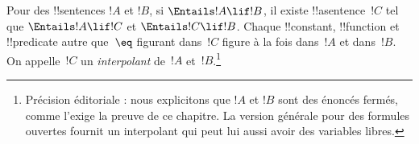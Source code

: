 \documentclass[../../../include/open-logic-section]{subfiles}
\begin{document}


\begin{thm}
Pour des !!{sentence}s $!A$ et $!B$, si $\Entails !A\lif !B$, il existe
!!a{sentence}~$!C$ tel que
$\Entails !A\lif !C$ et
$\Entails !C\lif !B$.
Chaque !!{constant}, !!{function} et
!!{predicate} autre que~$\eq$ figurant
dans~$!C$ figure à la fois dans~$!A$
et dans~$!B$. On appelle~$!C$ un
\emph{interpolant} de~$!A$ et~$!B$.\footnote{Précision éditoriale : nous explicitons que $!A$ et $!B$ sont des énoncés fermés, comme l'exige la preuve de ce chapitre. La version générale pour des formules ouvertes fournit un interpolant qui peut lui aussi avoir des variables libres.}
\end{thm}
\end{document}
